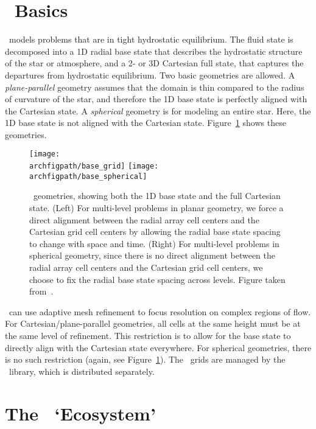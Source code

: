 \section{\maestro\ Basics}

\maestro\ models problems that are in tight hydrostatic equilibrium.
The fluid state is decomposed into a 1D radial base state that
describes the hydrostatic structure of the star or atmosphere, and a
2- or 3D Cartesian full state, that captures the departures from
hydrostatic equilibrium.  Two basic geometries are allowed.  A {\em
  plane-parallel} geometry assumes that the domain is thin compared to
the radius of curvature of the star, and therefore the 1D base state
is perfectly aligned with the Cartesian state.  A {\em spherical}
geometry is for modeling an entire star.  Here, the 1D base state is
not aligned with the Cartesian state.  Figure~\ref{fig:base_state}
shows these geometries.

\begin{figure}[tb]
\centering
\texttt{[image: \\archfigpath/base\_grid]} \hspace{0.5in}
\texttt{[image: \\archfigpath/base\_spherical]}
\caption[\maestro\ geometries]{\label{fig:base_state} \maestro\ geometries, showing both the
  1D base state and the full Cartesian state.  (Left) For multi-level
  problems in planar geometry, we force a direct alignment between the
  radial array cell centers and the Cartesian grid cell centers by
  allowing the radial base state spacing to change with space and
  time.  (Right) For multi-level problems in spherical geometry, since
  there is no direct alignment between the radial array cell centers
  and the Cartesian grid cell centers, we choose to fix the radial
  base state spacing across levels. Figure taken
  from~\cite{multilevel}.}
\end{figure}


\maestro\ can use adaptive mesh refinement to focus resolution on
complex regions of flow.  For Cartesian/plane-parallel geometries, all
cells at the same height must be at the same level of refinement.
This restriction is to allow for the base state to directly align with
the Cartesian state everywhere.  For spherical geometries, there is no
such restriction (again, see Figure~\ref{fig:base_state}).
The \maestro\ grids are managed by the \boxlib\ library, which is
distributed separately.



\section{The \maestro\ `Ecosystem'}

